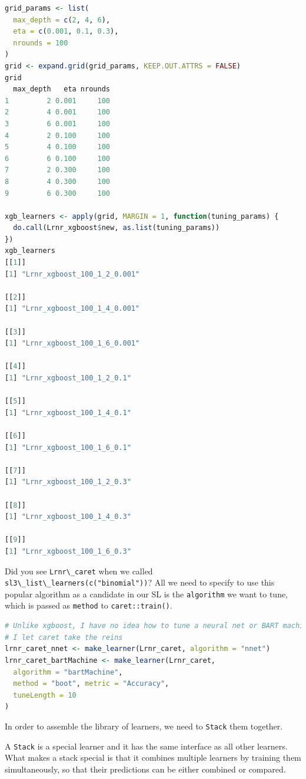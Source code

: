 \documentclass[
  12pt, krantz2,
]{book}
\newcommand{\passthrough}[1]{#1}
\theoremstyle{definition}
\theoremstyle{definition}
\theoremstyle{definition}
\newcommand{\1}{\mathbbm{1}}
\begin{document}
\begin{lstlisting}[language=R]
grid_params <- list(
  max_depth = c(2, 4, 6),
  eta = c(0.001, 0.1, 0.3),
  nrounds = 100
)
grid <- expand.grid(grid_params, KEEP.OUT.ATTRS = FALSE)
grid
  max_depth   eta nrounds
1         2 0.001     100
2         4 0.001     100
3         6 0.001     100
4         2 0.100     100
5         4 0.100     100
6         6 0.100     100
7         2 0.300     100
8         4 0.300     100
9         6 0.300     100

xgb_learners <- apply(grid, MARGIN = 1, function(tuning_params) {
  do.call(Lrnr_xgboost$new, as.list(tuning_params))
})
xgb_learners
[[1]]
[1] "Lrnr_xgboost_100_1_2_0.001"

[[2]]
[1] "Lrnr_xgboost_100_1_4_0.001"

[[3]]
[1] "Lrnr_xgboost_100_1_6_0.001"

[[4]]
[1] "Lrnr_xgboost_100_1_2_0.1"

[[5]]
[1] "Lrnr_xgboost_100_1_4_0.1"

[[6]]
[1] "Lrnr_xgboost_100_1_6_0.1"

[[7]]
[1] "Lrnr_xgboost_100_1_2_0.3"

[[8]]
[1] "Lrnr_xgboost_100_1_4_0.3"

[[9]]
[1] "Lrnr_xgboost_100_1_6_0.3"
\end{lstlisting}

Did you see \passthrough{\lstinline!Lrnr\_caret!} when we called \passthrough{\lstinline!sl3\_list\_learners(c("binomial"))!}? All
we need to specify to use this popular algorithm as a candidate in our SL is
the \passthrough{\lstinline!algorithm!} we want to tune, which is passed as \passthrough{\lstinline!method!} to \passthrough{\lstinline!caret::train()!}.

\begin{lstlisting}[language=R]
# Unlike xgboost, I have no idea how to tune a neural net or BART machine, so
# I let caret take the reins
lrnr_caret_nnet <- make_learner(Lrnr_caret, algorithm = "nnet")
lrnr_caret_bartMachine <- make_learner(Lrnr_caret,
  algorithm = "bartMachine",
  method = "boot", metric = "Accuracy",
  tuneLength = 10
)
\end{lstlisting}

In order to assemble the library of learners, we need to \passthrough{\lstinline!Stack!} them
together.

A \passthrough{\lstinline!Stack!} is a special learner and it has the same interface as all other
learners. What makes a stack special is that it combines multiple learners by
training them simultaneously, so that their predictions can be either combined
or compared.
\end{document}
